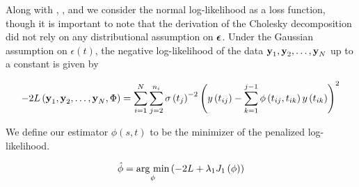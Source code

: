 \documentclass[12pt]{article}
\newcommand{\bfeps}{\mbox{\boldmath $\epsilon$}}
\newcommand{\lmr}{\fontfamily{lmr}\selectfont} %
\newcommand{\bfy}{\mbox{\bf y}}
\begin{document}
Along with \citet{huang2006covariance}, \citet{levina2008sparse}, and \citet{pourahmadi2000maximum} we consider the normal log-likelihood as a loss function, though it is important to note that the derivation of the Cholesky decomposition did not rely on any distributional assumption on $\bfeps$. Under the Gaussian assumption on $\epsilon\left(t\right)$, the negative log-likelihood of the data $\bfy_1,\bfy_2,\dots, \bfy_N$ up to a constant is given by

\begin{equation}
-2\lmr{L}\left(\bfy_1, \bfy_2, \dots,\bfy_N ,\Phi \right) = \sum_{i=1}^N \sum_{j=2}^{n_i} \sigma\left({t_j}\right)^{-2} \left(y\left({t_{ij}}\right) - \sum_{k=1}^{j-1}\phi\left({t_{ij},t_{ik}}\right)y\left({t_{ik}}\right) \right)^2 \label{loglikelihood}
\end{equation}




 We define our estimator $\hat{\phi}\left(s,t\right)$ to be the minimizer of the penalized log-likelihood. %


\begin{equation} 
\hat{\phi} = \mathop{\mbox{arg min}}_{\phi} \left( -2\lmr{L} + \lambda_1 J_1\left(\phi\right) \right) \label{stage1obj}
\end{equation}
\noindent
\end{document}
